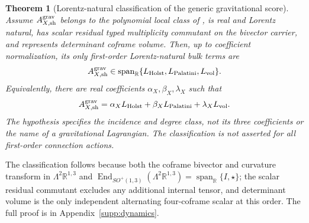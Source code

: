 \documentclass[11pt]{article}
\newtheorem{theorem}{Theorem}[section]
\numberwithin{equation}{section}
\theoremstyle{definition}
\theoremstyle{remark}
\newcommand{\R}{\mathbb R}
\newcommand{\Span}{\operatorname{span}}
\begin{document}
\begin{theorem}[Lorentz-natural classification of the generic gravitational score]
\label{thm:main-gravitational-classification}
Assume $A^{\rm grav}_{X,\rm sh}$ belongs to the polynomial local class of
, is real and Lorentz natural, has scalar
residual typed multiplicity commutant on the bivector carrier, and represents
determinant coframe volume.
Then, up to coefficient normalization, its only first-order Lorentz-natural
bulk terms are
\begin{equation}
 A^{\rm grav}_{X,\rm sh}
 \in\Span_{\R}\{L_{\rm Holst},L_{\rm Palatini},L_{\rm vol}\}.
 \label{eq:main-phv-classification}
\end{equation}
Equivalently, there are real coefficients $\alpha_X,\beta_X,\lambda_X$ such that
\begin{equation}
 A^{\rm grav}_{X,\rm sh}
 =\alpha_XL_{\rm Holst}+\beta_XL_{\rm Palatini}+\lambda_XL_{\rm vol}.
 \label{eq:main-phv-coefficients}
\end{equation}
The hypothesis specifies the incidence and degree class, not its three
coefficients or the name of a gravitational Lagrangian. The classification
is not asserted for all first-order connection actions.
\end{theorem}

The classification follows because both the coframe bivector and curvature
transform in $\Lambda^2\R^{1,3}$ and
$\operatorname{End}_{SO^+(1,3)}(\Lambda^2\R^{1,3})
=\Span_{\R}\{I,\star\}$; the scalar residual commutant excludes any additional
internal tensor, and determinant volume is the only independent alternating
four-coframe scalar at this order.  The full proof is in
Appendix~\ref{supp:dynamics}.
\end{document}
